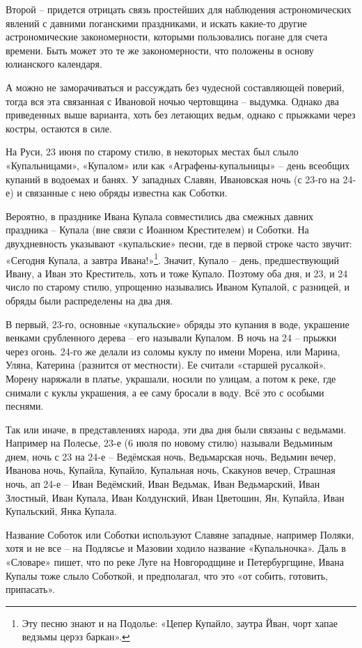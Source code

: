 Второй – придется отрицать связь простейших для наблюдения астрономических явлений с давними поганскими праздниками, и искать какие-то другие астрономические закономерности, которыми пользовались погане для счета времени. Быть может это те же закономерности, что положены в основу юлианского календаря.

А можно не заморачиваться и рассуждать без чудесной составляющей поверий, тогда вся эта связанная с Ивановой ночью чертовщина – выдумка. Однако два приведенных выше варианта, хоть без летающих ведьм, однако с прыжками через костры, остаются в силе.

На Руси, 23 июня по старому стилю, в некоторых местах был слыло «Купальницами», «Купалом» или как «Аграфены-купальницы» – день всеобщих купаний в водоемах и банях. У западных Славян, Ивановская ночь (с 23-го на 24-е) и связанные с нею обряды известна как Соботки.

Вероятно, в празднике Ивана Купала совместились два смежных давних праздника – Купала (вне связи с Иоанном Крестителем) и Соботки. На двухдневность указывают «купальские» песни, где в первой строке часто звучит: «Сегодня Купала, а завтра Ивана!»\footnote{Эту песню знают и на Подолье: «Цепер Купайло, заутра Йван, чорт хапае ведзьмы церэз баркан».}. Значит, Купало – день, предшествующий Ивану, а Иван это Креститель, хоть и тоже Купало. Поэтому оба дня, и 23, и 24 число по старому стилю, упрощенно назывались Иваном Купалой, с разницей, и обряды были распределены на два дня.

В первый, 23-го, основные «купальские» обряды это купания в воде, украшение венками срубленного дерева – его называли Купалом. В ночь на 24 – прыжки через огонь. 24-го же делали из соломы куклу по имени Морена, или Марина, Уляна, Катерина (разнится от местности). Ее считали «старшей русалкой». Морену наряжали в платье, украшали, носили по улицам, а потом к реке, где снимали с куклы украшения, а ее саму бросали в воду. Всё это с особыми песнями.

Так или иначе, в представлениях народа, эти два дня были связаны с ведьмами. Например на Полесье\cite{tolstaya01}, 23-е (6 июля по новому стилю) называли Ведьминым днем, ночь с 23 на 24-е – Ведёмская ночь, Ведьмарская ночь, Ведьмин вечер, Иванова ночь, Купайла, Купайло, Купальная ночь, Скакунов вечер, Страшная ночь, ап 24-е – Иван Ведёмский, Иван Ведьмак, Иван Ведьмарский, Иван Злостный, Иван Купала, Иван Колдунский, Иван Цветошин, Ян, Купайла, Иван Купальский, Янка Купала.

Название Соботок или Соботки используют Славяне западные, например Поляки, хотя и не все – на Подлясье и Мазовии ходило название «Купальночка». Даль в «Словаре» пишет, что по реке Луге на Новгородщине и Петербургщине, Ивана Купалы тоже слыло Соботкой, и предполагал, что это «от собить, готовить, припасать».

